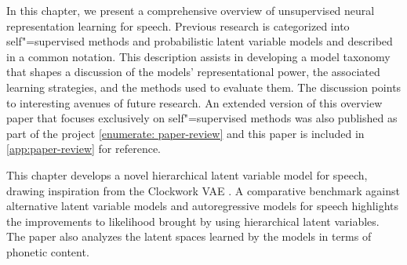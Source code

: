 In this chapter, we present a comprehensive overview of unsupervised neural representation learning for speech. Previous research is categorized into self"=supervised methods and probabilistic latent variable models and described in a common notation. This description assists in developing a model taxonomy that shapes a discussion of the models' representational power, the associated learning strategies, and the methods used to evaluate them. The discussion points to interesting avenues of future research. 
An extended version of this overview paper that focuses exclusively on self"=supervised methods was also published as part of the project \ref{enumerate: paper-review} \parencite{mohamed_selfsupervised_2022} and this paper is included in \cref{app:paper-review} for reference.

This chapter develops a novel hierarchical latent variable model for speech, drawing inspiration from the Clockwork VAE \parencite{saxena_clockwork_2021}. A comparative benchmark against alternative latent variable models and autoregressive models for speech highlights the improvements to likelihood brought by using hierarchical latent variables. The paper also analyzes the latent spaces learned by the models in terms of phonetic content.





